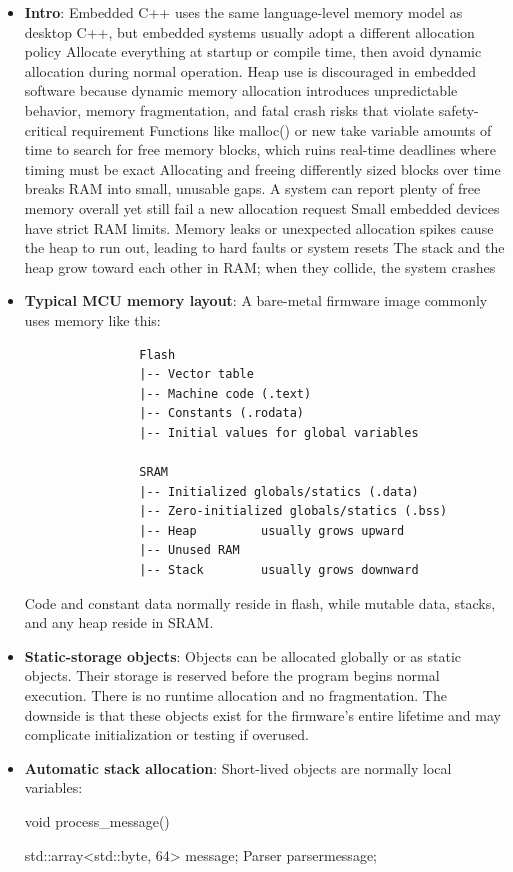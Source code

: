 \documentclass{report}
\begin{document}
    \pagebreak 
    \begin{itemize}
        \item \textbf{Intro}: Embedded C++ uses the same language-level memory model as desktop C++, but embedded systems usually adopt a different allocation policy
            \bigbreak \noindent 
            Allocate everything at startup or compile time, then avoid dynamic allocation during normal operation.
            \bigbreak \noindent 
            Heap use is discouraged in embedded software because dynamic memory allocation introduces unpredictable behavior, memory fragmentation, and fatal crash risks that violate safety-critical requirement
            \bigbreak \noindent 
            Functions like malloc() or new take variable amounts of time to search for free memory blocks, which ruins real-time deadlines where timing must be exact
            \bigbreak \noindent 
            Allocating and freeing differently sized blocks over time breaks RAM into small, unusable gaps. A system can report plenty of free memory overall yet still fail a new allocation request
            \bigbreak \noindent 
            Small embedded devices have strict RAM limits. Memory leaks or unexpected allocation spikes cause the heap to run out, leading to hard faults or system resets
            \bigbreak \noindent 
            The stack and the heap grow toward each other in RAM; when they collide, the system crashes
        \item \textbf{Typical MCU memory layout}: A bare-metal firmware image commonly uses memory like this:
            \begin{verbatim}
                Flash
                |-- Vector table
                |-- Machine code (.text)
                |-- Constants (.rodata)
                |-- Initial values for global variables

                SRAM
                |-- Initialized globals/statics (.data)
                |-- Zero-initialized globals/statics (.bss)
                |-- Heap         usually grows upward
                |-- Unused RAM
                |-- Stack        usually grows downward
            \end{verbatim}
            \bigbreak \noindent 
            Code and constant data normally reside in flash, while mutable data, stacks, and any heap reside in SRAM.
        \item \textbf{Static-storage objects}: Objects can be allocated globally or as static objects. Their storage is reserved before the program begins normal execution. There is no runtime allocation and no fragmentation.
            \bigbreak \noindent 
            The downside is that these objects exist for the firmware’s entire lifetime and may complicate initialization or testing if overused.
        \item \textbf{Automatic stack allocation}: Short-lived objects are normally local variables:
            \bigbreak \noindent 
            \begin{cppcode}
                void process_message() {
                    std::array<std::byte, 64> message{};
                    Parser parser{message};

}
\end{cppcode}
\end{itemize}
\end{document}

